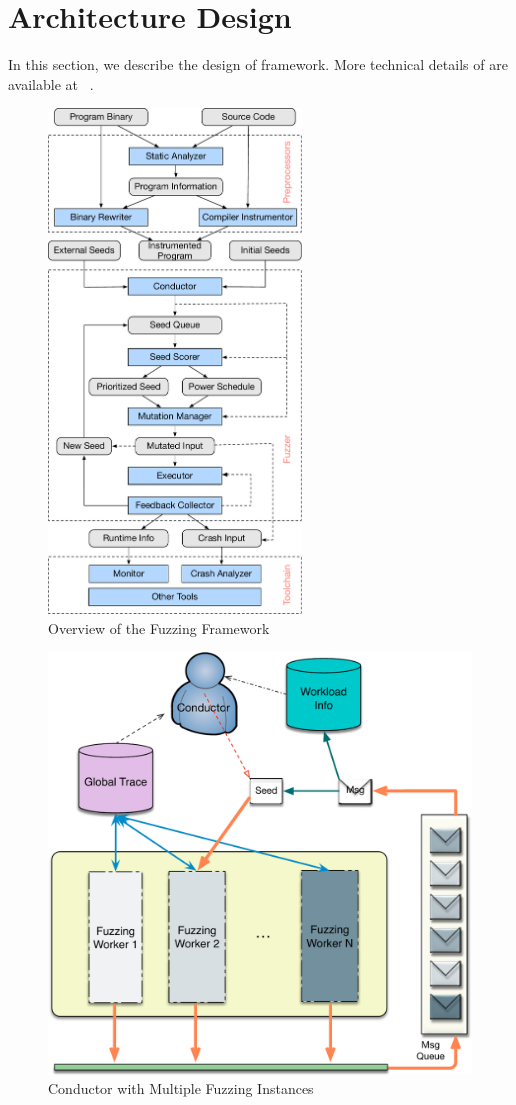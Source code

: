\section{Architecture Design}\label{sec:details}

In this section, we describe the design of {\FOT} framework.
More technical details of {\FOT} are available at ~\cite{fot-webpage}.


\begin{figure}[t]
	\centering
	\includegraphics[width=0.6\textwidth]{res/fot/FOT_overview}
	\caption{Overview of the {\FOT} Fuzzing Framework}
	\label{fig:fot_workflow}
\end{figure}

\begin{figure}[t]
	\centering
	\includegraphics[width=0.6\columnwidth]{res/fot/mt_workflow}
	\caption{Conductor with Multiple Fuzzing Instances}
	\label{fig:mt_workflow}
\end{figure}


